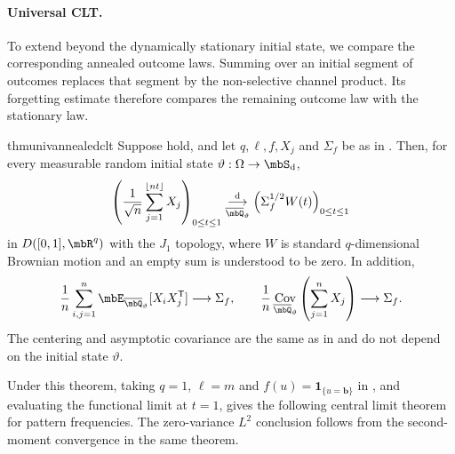 \documentclass[a4paper]{article}
\numberwithin{equation}{section}   %
\theoremstyle{plain}   %
\theoremstyle{plain}   %
\theoremstyle{examplestyle}
\DeclareMathOperator{\states}{\mbS_d}   %
\DeclareMathOperator{\Cov}{Cov}
\begin{document}
    \paragraph{Universal CLT.}
        To extend  beyond the dynamically stationary initial state, we compare the corresponding annealed outcome laws.
        Summing over an initial segment of outcomes replaces that segment by the non-selective channel product. 
        Its forgetting estimate therefore compares the remaining outcome law with the stationary law.

        \begin{restatable}{thm}{univannealedclt}
        \label{thm:universal-functional}
            Suppose  hold, and let $q,\ell,f,X_j$ and $\Sigma_f$ be as in .
            Then, for every measurable random initial state $\vartheta:\Omega\to\states$,
            \[
                \left(
                    \frac1{\sqrt n}
                    \sum_{j=1}^{\lfloor nt\rfloor}X_j
                \right)_{0\le t\le1}
                \underset{\overline\mbQ_\vartheta} {\overset{\mathrm d}{\longrightarrow}}
                \left(\Sigma_f^{1/2}W(t)\right)_{0\le t\le1}
            \]
            in $D([0,1],\mbR^q)$ with the $J_1$ topology,  where $W$ is standard $q$-dimensional Brownian motion and an empty sum is understood to be zero.
            In addition,
            \begin{equation}
            \label{second_moment_universal_clt}
                \frac1n
                \sum_{i,j=1}^n
                \mbE_{\overline\mbQ_\vartheta}
                    [X_iX_j^{\mathsf T}]
                \longrightarrow\Sigma_f,
                \qquad
                \frac1n
                \Cov_{\overline\mbQ_\vartheta}
                    \left(\sum_{j=1}^nX_j\right)
                \longrightarrow\Sigma_f.
            \end{equation}
            The centering and asymptotic covariance are the same as in  and do not depend on the initial state $\vartheta$.
        \end{restatable}

    Under this theorem, taking $q=1$, $\ell=m$ and $f(u)=\mathbf1_{\{u=\pmb b\}}$ in , and evaluating the functional limit at $t=1$, gives the following central limit theorem for pattern frequencies.
    The zero-variance $L^2$ conclusion follows from the second-moment convergence in the same theorem.
    
\end{document}
